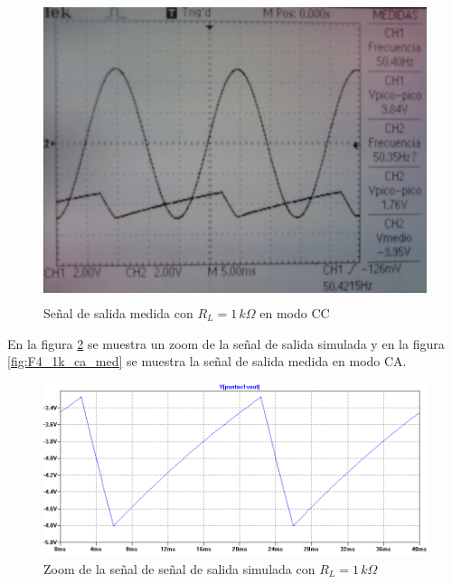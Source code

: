 \documentclass[10pt,spanish,a4paper,openany,notitlepage]{article}
\begin{document}
\begin{enumerate}
    \begin{figure}[H]
    \centering
    \includegraphics[width=350pt, height=250pt]{mediciones/F4-1K.jpg}
    \caption{Señal de salida medida con $R_L = 1\,\unit{k\Omega}$ en modo CC}
    \label{fig:F1_4k_cc_med}
    \end{figure}
    
    En la figura \ref{fig:F4_1k_ca_sim} se muestra un zoom de la señal de salida simulada y en
    la figura \ref{fig:F4_1k_ca_med} se muestra la señal de salida medida en modo CA.
    
    \begin{figure}[H]
    \centering
    \includegraphics[scale=0.65]{simulaciones/F4_vo_RL-1k_zoom.png}
    \caption{Zoom de la señal de señal de salida simulada con $R_L = 1\,\unit{k\Omega}$}
    \label{fig:F4_1k_ca_sim}
    \end{figure}
    

\end{enumerate}
\end{document}
